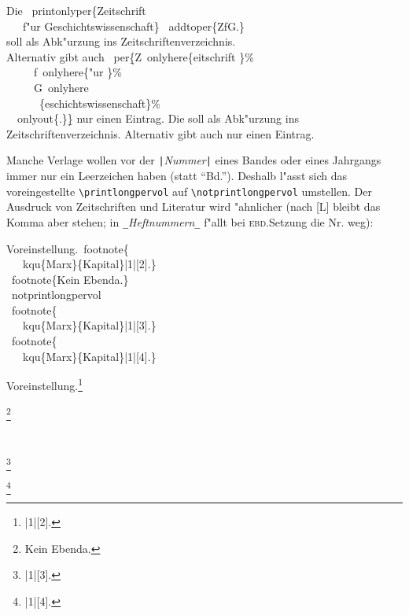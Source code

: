 \documentclass[12pt,a4paper]{article}
\newcommand{\pbs}{\string\ \unskip}
\newcommand{\bs}{\protect\pbs}
\begin{document}
\vspace{-.25ex}
\Doppelbox
{
Die \bs printonlyper\{Zeitschrift
\\ \ \ \ f"ur Geschichtswissenschaft\} 
\bs addtoper\{ZfG.\} 
\\ soll als Abk"urzung ins Zeitschriftenverzeichnis. 
\\[.25ex] Alternativ gibt auch 
\bs per\b{\{}Z\bs onlyhere\{eitschrift \}\%
\\ \ \ \ \ \ f\bs onlyhere\{"ur \}\%
\\ \ \ \ \ \ G\bs onlyhere
\\ \ \ \ \ \ \ \{eschichtswissenschaft\}\%
\\ \ \bs onlyout\{.\}\b{\}} nur einen Eintrag.
}
{
Die  
soll als Abk"urzung ins Zeitschriftenverzeichnis.
Alternativ gibt auch 
 nur einen Eintrag.
\\[.75ex]
\vspace{-.75ex}
}

\vspace{.5ex}\noindent
Manche Verlage wollen vor der \verb+|+\textit{Nummer}\verb+|+ eines
Bandes oder eines Jahrgangs immer nur ein Leerzeichen haben (statt "`Bd."').
Deshalb l"asst sich das voreingestellte \verb|\printlongpervol|
auf \verb|\notprintlongpervol| umstellen. Der Ausdruck von Zeitschriften 
und Literatur wird "ahnlicher (nach [L] bleibt das Komma aber stehen;
in \verb+_+\textit{Heftnummern}\verb+_+ f"allt bei \textsc{ebd.}\hy Setzung  
die {\footnotesize Nr.} weg):

\Doppelbox
{
Voreinstellung.\bs footnote\{ 
\\ \ \ \bs kqu\{Marx\}\{Kapital\}\string|1\string|[2].\}
\\[1ex] \bs footnote\{Kein Ebenda.\}
\\[4ex] \bs notprintlongpervol
\\[1ex] \bs footnote\{ 
\\ \ \ \bs kqu\{Marx\}\{Kapital\}\string|1\string|[3].\}
\\[1ex] \bs footnote\{ 
\\ \ \ \bs kqu\{Marx\}\{Kapital\}\string|1\string|[4].\}
}
{
Voreinstellung.\footnote{
|1|[2].}

\footnote{Kein Ebenda.}

\

\notprintlongpervol
\footnote{
|1|[3].}

\footnote{
|1|[4].}
}\label{notprintlongpagefolio}
\end{document}
